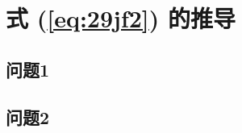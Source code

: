 \chapter{  式 (\ref{eq:29jf2}) 的推导}

\zhlipsum[1]
\section{问题1}
\zhlipsum[2]
\section{问题2}
\zhlipsum[3]